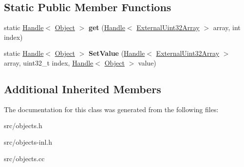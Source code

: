 \subsection*{Static Public Member Functions}
\begin{DoxyCompactItemize}
\item 
\hypertarget{classv8_1_1internal_1_1_external_uint32_array_a7691e3b930cafe7a3005048ed5c29bf6}{}static \hyperlink{classv8_1_1internal_1_1_handle}{Handle}$<$ \hyperlink{classv8_1_1internal_1_1_object}{Object} $>$ {\bfseries get} (\hyperlink{classv8_1_1internal_1_1_handle}{Handle}$<$ \hyperlink{classv8_1_1internal_1_1_external_uint32_array}{External\+Uint32\+Array} $>$ array, int index)\label{classv8_1_1internal_1_1_external_uint32_array_a7691e3b930cafe7a3005048ed5c29bf6}

\item 
\hypertarget{classv8_1_1internal_1_1_external_uint32_array_a2d6f8a703586f86e5df9eacd665a66a3}{}static \hyperlink{classv8_1_1internal_1_1_handle}{Handle}$<$ \hyperlink{classv8_1_1internal_1_1_object}{Object} $>$ {\bfseries Set\+Value} (\hyperlink{classv8_1_1internal_1_1_handle}{Handle}$<$ \hyperlink{classv8_1_1internal_1_1_external_uint32_array}{External\+Uint32\+Array} $>$ array, uint32\+\_\+t index, \hyperlink{classv8_1_1internal_1_1_handle}{Handle}$<$ \hyperlink{classv8_1_1internal_1_1_object}{Object} $>$ value)\label{classv8_1_1internal_1_1_external_uint32_array_a2d6f8a703586f86e5df9eacd665a66a3}

\end{DoxyCompactItemize}
\subsection*{Additional Inherited Members}


The documentation for this class was generated from the following files\+:\begin{DoxyCompactItemize}
\item 
src/objects.\+h\item 
src/objects-\/inl.\+h\item 
src/objects.\+cc\end{DoxyCompactItemize}
